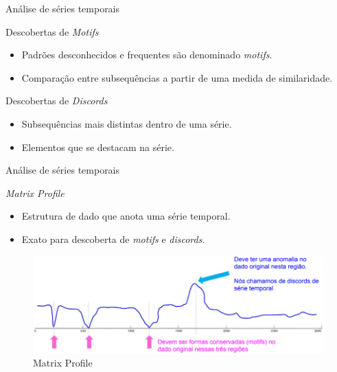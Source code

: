 \documentclass[apesctratio=169]{beamer}
\begin{document}
        \begin{frame}{Análise de séries temporais}
            \begin{block}{Descobertas de \textit{Motifs}}
	             \begin{itemize}
	                 \item Padrões desconhecidos e frequentes são denominado \textit{motifs}.
	                 \item Comparação entre subsequências a partir de uma medida de similaridade.
	             \end{itemize}
	        \end{block}
	        
	        \begin{block}{Descobertas de \textit{Discords}}
	             \begin{itemize}
	                 \item Subsequências mais distintas dentro de uma série.
	                 \item Elementos que se destacam na série.
	             \end{itemize}
	        \end{block}
	    \end{frame}
	    
	    \begin{frame}{Análise de séries temporais}
	        
	        \begin{block}{\textit{Matrix Profile}}
	             \begin{itemize}
	                 \item Estrutura de dado que anota uma série temporal.
	                 \item Exato para descoberta de \textit{motifs} e \textit{discords}.
	            \end{itemize}
	        \end{block}
            
	        \begin{figure}[H]
    			     \includegraphics[scale=0.5]{mp.PNG}
    			     \caption{Matrix Profile}
    		\end{figure}
	   \end{frame}
	   
\end{document}
